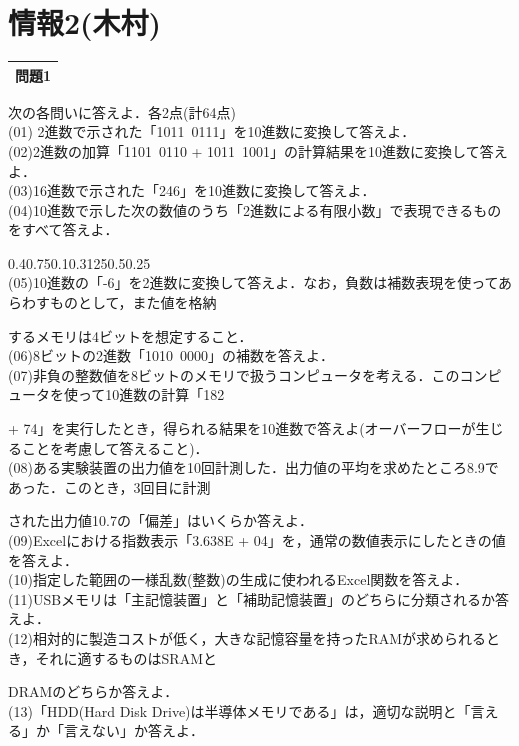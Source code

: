 \section{情報2(木村)}
\noindent\begin{tabular}{|c|} %
  \hline
  問題1 \\
  \hline
\end{tabular}
次の各問いに答えよ．各2点(計64点)\\
(01) 2進数で示された「1011~0111」を10進数に変換して答えよ．\\
(02)2進数の加算「1101~0110 + 1011~1001」の計算結果を10進数に変換して答えよ．\\
(03)16進数で示された「246」を10進数に変換して答えよ．\\
(04)10進数で示した次の数値のうち「2進数による有限小数」で表現できるものをすべて答えよ．\par\quad
{}0.4\quad {}0.75\quad {}0.1\quad {}0.3125\quad {}0.5\quad {}0.25\\
(05)10進数の「-6」を2進数に変換して答えよ．なお，負数は補数表現を使ってあらわすものとして，また値を格納\par\quad するメモリは4ビットを想定すること．\\
(06)8ビットの2進数「1010~0000」の補数を答えよ．\\
(07)非負の整数値を8ビットのメモリで扱うコンピュータを考える．このコンピュータを使って10進数の計算「182\par\quad+ 74」を実行したとき，得られる結果を10進数で答えよ(オーバーフローが生じることを考慮して答えること)．\\
(08)ある実験装置の出力値を10回計測した．出力値の平均を求めたところ8.9であった．このとき，3回目に計測\par\quad された出力値10.7の「偏差」はいくらか答えよ．\\
(09)Excelにおける指数表示「3.638E + 04」を，通常の数値表示にしたときの値を答えよ．\\
(10)指定した範囲の一様乱数(整数)の生成に使われるExcel関数を答えよ．\\
(11)USBメモリは「主記憶装置」と「補助記憶装置」のどちらに分類されるか答えよ．\\
(12)相対的に製造コストが低く，大きな記憶容量を持ったRAMが求められるとき，それに適するものはSRAMと\par\quad DRAMのどちらか答えよ．\\
(13)「HDD(Hard Disk Drive)は半導体メモリである」は，適切な説明と「言える」か「言えない」か答えよ．\\
